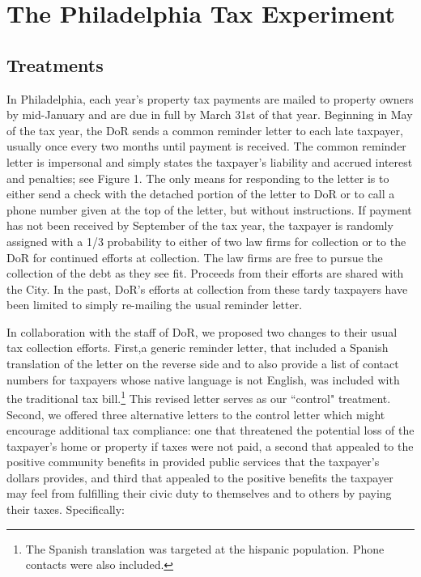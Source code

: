 \documentclass[12pt,titlepage]{article}
\begin{document}
\section{The Philadelphia Tax Experiment}

\subsection{Treatments}

In Philadelphia, each year's property tax payments are mailed to
property owners by mid-January and are due in full by March 31st of
that year.  Beginning in May of the tax year, the DoR sends a common
reminder letter to each late taxpayer, usually once every two months
until payment is received.  The common reminder letter is impersonal
and simply states the taxpayer's liability and accrued interest and
penalties; see Figure 1.  The only means for responding to the letter
is to either send a check with the detached portion of the letter to
DoR or to call a phone number given at the top of the letter, but
without instructions.  If payment has not been received by September
of the tax year, the taxpayer is randomly assigned with a 1/3
probability to either of two law firms for collection or to the DoR
for continued efforts at collection.  The law firms are free to pursue
the collection of the debt as they see fit.  Proceeds from their
efforts are shared with the City.  In the past, DoR's efforts at
collection from these tardy taxpayers have been limited to simply
re-mailing the usual reminder letter.

In collaboration with the staff of DoR, we proposed two changes to
their usual tax collection efforts.  First,a generic reminder
letter, that included a Spanish translation of the letter on
the reverse side and to also provide a list of contact numbers for
taxpayers whose native language is not English, was included with the traditional tax
bill.\footnote{The Spanish
  translation was targeted at the hispanic population.  Phone
  contacts were also included.}  This revised letter serves as our
``control" treatment.  Second, we offered three alternative letters to
the control letter which might encourage additional tax compliance:
one that threatened the potential loss of the taxpayer's home or
property if taxes were not paid, a second that appealed to the
positive community benefits in provided public services that the
taxpayer's dollars provides, and third that appealed to the positive
benefits the taxpayer may feel from fulfilling their civic duty to
themselves and to others by paying their taxes.  Specifically:
\end{document}
